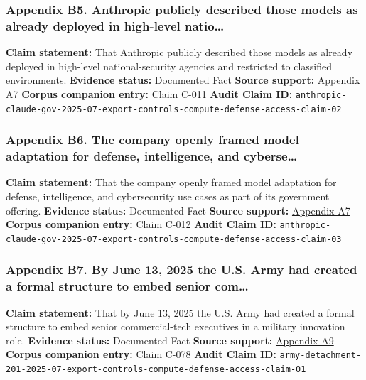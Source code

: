 \documentclass[
  american,
  11pt,
  letterpaper,
]{article}
\begin{document}
\subsubsection{Appendix B5. Anthropic publicly described those models as
already deployed in high-level
natio\ldots{}}\label{ch-07-appendix-b5-anthropic-publicly-described-those-models-as-already-deployed-in-high-level-natio}

\textbf{Claim statement:} That Anthropic publicly described those models
as already deployed in high-level national-security agencies and
restricted to classified environments. \textbf{Evidence status:}
Documented Fact \textbf{Source support:}
\hyperref[ch-07-appendix-a7-claude-gov-models-for-u-s-national-security-customers]{Appendix
A7} \textbf{Corpus companion entry:} Claim C-011 \textbf{Audit Claim
ID:}
\texttt{anthropic-claude-gov-2025-07-export-controls-compute-defense-access-claim-02}

\subsubsection{Appendix B6. The company openly framed model adaptation
for defense, intelligence, and
cyberse\ldots{}}\label{ch-07-appendix-b6-the-company-openly-framed-model-adaptation-for-defense-intelligence-and-cyberse}

\textbf{Claim statement:} That the company openly framed model
adaptation for defense, intelligence, and cybersecurity use cases as
part of its government offering. \textbf{Evidence status:} Documented
Fact \textbf{Source support:}
\hyperref[ch-07-appendix-a7-claude-gov-models-for-u-s-national-security-customers]{Appendix
A7} \textbf{Corpus companion entry:} Claim C-012 \textbf{Audit Claim
ID:}
\texttt{anthropic-claude-gov-2025-07-export-controls-compute-defense-access-claim-03}

\subsubsection{Appendix B7. By June 13, 2025 the U.S. Army had created a
formal structure to embed senior
com\ldots{}}\label{ch-07-appendix-b7-by-june-13-2025-the-u-s-army-had-created-a-formal-structure-to-embed-senior-com}

\textbf{Claim statement:} That by June 13, 2025 the U.S. Army had
created a formal structure to embed senior commercial-tech executives in
a military innovation role. \textbf{Evidence status:} Documented Fact
\textbf{Source support:}
\hyperref[ch-07-appendix-a9-army-launches-detachment-201-executive-innovation-corps-to-drive-tech-transformation]{Appendix
A9} \textbf{Corpus companion entry:} Claim C-078 \textbf{Audit Claim
ID:}
\texttt{army-detachment-201-2025-07-export-controls-compute-defense-access-claim-01}
\end{document}
